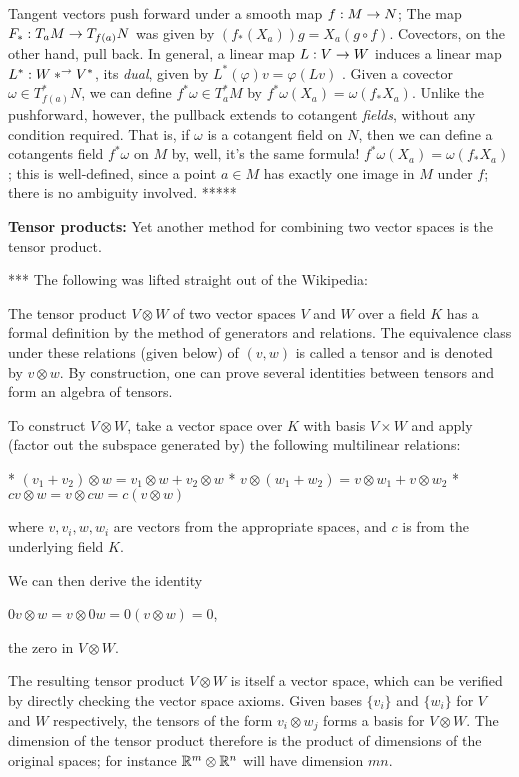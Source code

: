 \msk

Tangent vectors push forward under a smooth map $f:M\rightarrow N$; The map $F_*:T_aM\rightarrow T_{f(a)}N$
was given by 
$(f_*(X_a))g=X_a(g\circ f)$. Covectors, on the other hand, pull back. In general, a linear map
$L:V\rightarrow W$ induces a linear map $L^*:W*^\rightarrow V^*$, its {\it dual}, given by $L^*(\varphi)v =\varphi(Lv)$ . 
Given a covector $\omega\in T^*_{f(a)}N$, we can define $f^*\omega\in T^*_aM$ by
$f^*\omega(X_a)=\omega(f_*X_a)$. Unlike the pushforward, however, the pullback extends to cotangent
{\it fields}, without any condition required. That is, if $\omega$ is a cotangent field on $N$, then 
we can define a cotangents field $f^*\omega$ on $M$ by, well, it's the same formula!
$f^*\omega(X_a)=\omega(f_*X_a)$ ; this is well-defined, since a point $a\in M$ has exactly one
image in $M$ under $f$; there is no ambiguity involved. *****


{\bf Tensor products:} Yet another method for combining two vector spaces is the tensor 
product. 

\msk

*** The following was lifted straight out of the Wikipedia: 

\ssk

The tensor product 
$V \otimes W$ of two vector spaces $V$ and $W$ over a field $K$ 
has a formal definition by the method of generators and relations. 
The equivalence class under these relations (given below) of 
$(v,w)$ is called a tensor and is denoted by $v \otimes w$. 
By construction, one can prove several identities between tensors 
and form an algebra of tensors.

To construct $V \otimes W$, take a vector space over $K$ with basis $V \times W$ 
and apply (factor out the subspace generated by) the following multilinear relations:

    * $(v_1+v_2)\otimes w=v_1\otimes w+v_2\otimes w$
    * $v\otimes (w_1+w_2)=v\otimes w_1+v\otimes w_2$
    * $cv\otimes w=v\otimes cw=c(v\otimes w)$

where $v,v_i,w,w_i$ are vectors from the appropriate spaces, 
and $c$ is from the underlying field $K$.

We can then derive the identity

    $0v\otimes w=v\otimes 0w=0(v\otimes w)=0$,

the zero in $V \otimes W$.

The resulting tensor product $V \otimes W$ is itself a vector space, 
which can be verified by directly checking the vector space axioms. 
Given bases $\{v_i\}$ and $\{w_i\}$ for $V$ and $W$ respectively, 
the tensors of the form $v_i \otimes w_j$ forms a basis for $V \otimes W$. 
The dimension of the tensor product therefore is the product of dimensions 
of the original spaces; for instance ${\Bbb R}^m \otimes {\Bbb R}^n$ will have dimension $mn$.



